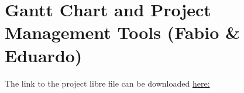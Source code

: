  \section{Gantt Chart and Project Management Tools (Fabio \& Eduardo)}
 The link to the project libre file can be downloaded \href{https://github.com/fabiomatos999/M.O.S.I.S/blob/capstone/Proposal%20Report/Project%20Schedule/M.O.S.I.S%20UI%202.0%20Schedule.pod}{here:}
 